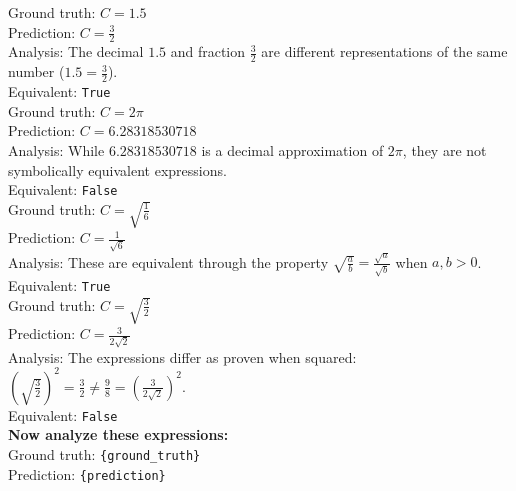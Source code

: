 \begin{textcolorbox}
Ground truth: $C=1.5$\\
Prediction: $C=\frac{3}{2}$\\
Analysis: The decimal $1.5$ and fraction $\frac{3}{2}$ are different representations of the same number ($1.5 = \frac{3}{2}$).\\
Equivalent: \texttt{True}\\

Ground truth: $C=2\pi$\\
Prediction: $C=6.28318530718$\\
Analysis: While $6.28318530718$ is a decimal approximation of $2\pi$, they are not symbolically equivalent expressions.\\
Equivalent: \texttt{False}\\

Ground truth: $C=\sqrt{\frac{1}{6}}$\\
Prediction: $C=\frac{1}{\sqrt{6}}$\\
Analysis: These are equivalent through the property $\sqrt{\frac{a}{b}} = \frac{\sqrt{a}}{\sqrt{b}}$ when $a,b > 0$.\\
Equivalent: \texttt{True}\\

Ground truth: $C=\sqrt{\frac{3}{2}}$\\
Prediction: $C=\frac{3}{2\sqrt{2}}$\\
Analysis: The expressions differ as proven when squared: $(\sqrt{\frac{3}{2}})^2 = \frac{3}{2} \neq \frac{9}{8} = (\frac{3}{2\sqrt{2}})^2$.\\
Equivalent: \texttt{False}\\

\textbf{Now analyze these expressions:}\\
Ground truth: \texttt{{\{ground\_truth\}}} \\
Prediction: \texttt{{\{prediction\}}}
\end{textcolorbox}